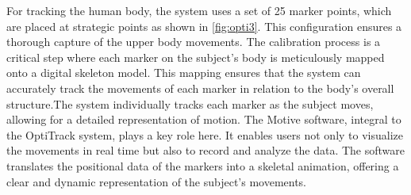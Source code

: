 For tracking the human body, the system uses a set of 25 marker points, which are placed at strategic points as shown in {\autoref{fig:opti3}}. This configuration ensures a thorough capture of the upper body movements. The calibration process is a critical step where each marker on the subject's body is meticulously mapped onto a digital skeleton model. This mapping ensures that the system can accurately track the movements of each marker in relation to the body's overall structure.The system individually tracks each marker as the subject moves, allowing for a detailed representation of motion.
The Motive software, integral to the OptiTrack system, plays a key role here. It enables users not only to visualize the movements in real time but also to record and analyze the data. The software translates the positional data of the markers into a skeletal animation, offering a clear and dynamic representation of the subject's movements.

